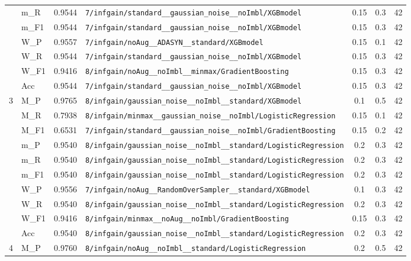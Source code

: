 \begin{table}[htbp]
\begin{tabular}{|c|l|c|>{\ttfamily\footnotesize}p{7.2cm}|c|c|c|}
 & m\_R & 0.9544 & \texttt{7/infgain/standard\_\_gaussian\_noise\_\_noImbl/XGBmodel} & 0.15 & 0.3  & 42 \\ 
 & m\_F1 & 0.9544 & \texttt{7/infgain/standard\_\_gaussian\_noise\_\_noImbl/XGBmodel} & 0.15 & 0.3  & 42 \\ 
 & W\_P & 0.9557 & \texttt{7/infgain/noAug\_\_ADASYN\_\_standard/XGBmodel} & 0.15 & 0.1  & 42 \\ 
 & W\_R & 0.9544 & \texttt{7/infgain/standard\_\_gaussian\_noise\_\_noImbl/XGBmodel} & 0.15 & 0.3  & 42 \\ 
 & W\_F1 & 0.9416 & \texttt{8/infgain/noAug\_\_noImbl\_\_minmax/GradientBoosting} & 0.15 & 0.3  & 42 \\ 
 & Acc & 0.9544 & \texttt{7/infgain/standard\_\_gaussian\_noise\_\_noImbl/XGBmodel} & 0.15 & 0.3  & 42 \\ 
\hline
\multirow{10}{*}{3} & M\_P & 0.9765 & \texttt{8/infgain/gaussian\_noise\_\_noImbl\_\_standard/XGBmodel} & 0.1 & 0.5  & 42 \\ 
 & M\_R & 0.7938 & \texttt{8/infgain/minmax\_\_gaussian\_noise\_\_noImbl/LogisticRegression} & 0.15 & 0.1  & 42 \\ 
 & M\_F1 & 0.6531 & \texttt{7/infgain/standard\_\_gaussian\_noise\_\_noImbl/GradientBoosting} & 0.15 & 0.2  & 42 \\ 
 & m\_P & 0.9540 & \texttt{8/infgain/gaussian\_noise\_\_noImbl\_\_standard/LogisticRegression} & 0.2 & 0.3  & 42 \\ 
 & m\_R & 0.9540 & \texttt{8/infgain/gaussian\_noise\_\_noImbl\_\_standard/LogisticRegression} & 0.2 & 0.3  & 42 \\ 
 & m\_F1 & 0.9540 & \texttt{8/infgain/gaussian\_noise\_\_noImbl\_\_standard/LogisticRegression} & 0.2 & 0.3  & 42 \\ 
 & W\_P & 0.9556 & \texttt{7/infgain/noAug\_\_RandomOverSampler\_\_standard/XGBmodel} & 0.1 & 0.3  & 42 \\ 
 & W\_R & 0.9540 & \texttt{8/infgain/gaussian\_noise\_\_noImbl\_\_standard/LogisticRegression} & 0.2 & 0.3  & 42 \\ 
 & W\_F1 & 0.9416 & \texttt{8/infgain/minmax\_\_noAug\_\_noImbl/GradientBoosting} & 0.15 & 0.3  & 42 \\ 
 & Acc & 0.9540 & \texttt{8/infgain/gaussian\_noise\_\_noImbl\_\_standard/LogisticRegression} & 0.2 & 0.3  & 42 \\ 
\hline
\multirow{10}{*}{4} & M\_P & 0.9760 & \texttt{8/infgain/noAug\_\_noImbl\_\_standard/LogisticRegression} & 0.2 & 0.5  & 42 \\ 

\end{tabular}
\end{table}
